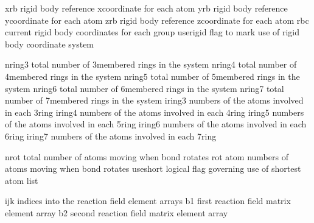\documentclass[letterpaper,11pt,english]{sphinxmanual}
\begin{document}

\begin{sphinxVerbatim}[commandchars=\\\{\}]
xrb             rigid body reference x\PYGZhy{}coordinate for each atom
yrb             rigid body reference y\PYGZhy{}coordinate for each atom
zrb             rigid body reference z\PYGZhy{}coordinate for each atom
rbc             current rigid body coordinates for each group
use\PYGZus{}rigid       flag to mark use of rigid body coordinate system
\end{sphinxVerbatim}


\begin{sphinxVerbatim}[commandchars=\\\{\}]
nring3          total number of 3\PYGZhy{}membered rings in the system
nring4          total number of 4\PYGZhy{}membered rings in the system
nring5          total number of 5\PYGZhy{}membered rings in the system
nring6          total number of 6\PYGZhy{}membered rings in the system
nring7          total number of 7\PYGZhy{}membered rings in the system
iring3          numbers of the atoms involved in each 3\PYGZhy{}ring
iring4          numbers of the atoms involved in each 4\PYGZhy{}ring
iring5          numbers of the atoms involved in each 5\PYGZhy{}ring
iring6          numbers of the atoms involved in each 6\PYGZhy{}ring
iring7          numbers of the atoms involved in each 7\PYGZhy{}ring
\end{sphinxVerbatim}


\begin{sphinxVerbatim}[commandchars=\\\{\}]
nrot            total number of atoms moving when bond rotates
rot             atom numbers of atoms moving when bond rotates
use\PYGZus{}short       logical flag governing use of shortest atom list
\end{sphinxVerbatim}


\begin{sphinxVerbatim}[commandchars=\\\{\}]
ijk             indices into the reaction field element arrays
b1              first reaction field matrix element array
b2              second reaction field matrix element array
\end{sphinxVerbatim}
\end{document}
